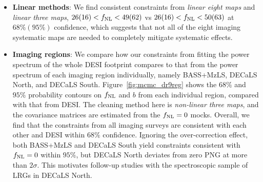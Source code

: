 \begin{itemize}[itemindent=*]

\item \textbf{Linear methods}: We find consistent constraints from \textit{linear eight maps} and \textit{linear three maps}, $26(16)<f_{\rm NL}<49(62)$ vs $26(16)<f_{\rm NL}<50(63)$ at $68\%(95\%)$ confidence, which suggests that not all of the eight imaging systematic maps are needed to completely mitigate systematic effects. 

\item \textbf{Imaging regions}: We compare how our constraints from fitting the power spectrum of the whole DESI footprint compares to that from the power spectrum of each imaging region individually, namely BASS+MzLS, DECaLS North, and DECaLS South. Figure~\ref{fig:mcmc_dr9reg} shows the $68\%$ and $95\%$ probability contours on $f_{\rm NL}$ and $b$ from each individual region, compared with that from DESI. The cleaning method here is \textit{non-linear three maps}, and the covariance matrices are estimated from the $f_{\rm NL}=0$ mocks. Overall, we find that the constraints from all imaging surveys are consistent with each other and DESI within $68\%$ confidence. Ignoring the over-correction effect, both BASS+MzLS and DECaLS South yield constraints consistent with $f_{\rm NL}=0$ within $95\%$, but DECaLS North deviates from zero PNG at more than $2\sigma$. This motivates follow-up studies with the spectroscopic sample of LRGs in DECaLS North.  


\end{itemize}
